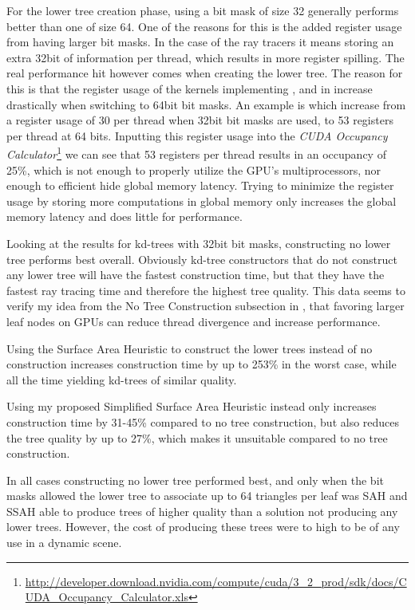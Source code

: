 For the lower tree creation phase, using a bit mask of size 32 generally
performs better than one of size 64. One of the reasons for this is the added
register usage from having larger bit masks. In the case of the ray tracers it
means storing an extra 32bit of information per thread, which results in more
register spilling. The real performance hit however comes when creating the
lower tree. The reason for this is that the register usage of the kernels
implementing ,  and
 in  increase
drastically when switching to 64bit bit masks. An example is
 which increase from a register usage of 30 per
thread when 32bit bit masks are used, to 53 registers per thread at 64
bits. Inputting this register usage into the \textit{CUDA Occupancy
  Calculator}\footnote{\url{http://developer.download.nvidia.com/compute/cuda/3_2_prod/sdk/docs/CUDA_Occupancy_Calculator.xls}}
we can see that 53 registers per thread results in an occupancy of 25\%, which
is not enough to properly utilize the GPU's multiprocessors, nor enough to
efficient hide global memory latency. Trying to minimize the register usage by
storing more computations in global memory only increases the global memory
latency and does little for performance.

Looking at the results for kd-trees with 32bit bit masks, constructing no lower
tree performs best overall. Obviously kd-tree constructors that do not construct
any lower tree will have the fastest construction time, but that they have the
fastest ray tracing time and therefore the highest tree quality. This data seems
to verify my idea from the No Tree Construction subsection in
, that favoring larger leaf nodes on GPUs can reduce
thread divergence and increase performance.

Using the Surface Area Heuristic to construct the lower trees instead of no
construction increases construction time by up to 253\% in the worst case, while
all the time yielding kd-trees of similar quality.

Using my proposed Simplified Surface Area Heuristic instead only increases
construction time by 31-45\% compared to no tree construction, but also reduces
the tree quality by up to 27\%, which makes it unsuitable compared to no tree
construction.

In all cases constructing no lower tree performed best, and only when the bit
masks allowed the lower tree to associate up to 64 triangles per leaf was SAH
and SSAH able to produce trees of higher quality than a solution not producing
any lower trees. However, the cost of producing these trees were to high to be
of any use in a dynamic scene.
